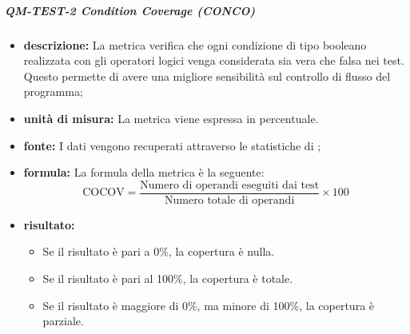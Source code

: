             \subparagraph{QM-TEST-2 Condition Coverage (CONCO)}
            \begin{itemize}
                \item \textbf{descrizione: }
                    La metrica verifica che ogni condizione di tipo booleano realizzata con gli operatori logici venga considerata sia vera che falsa nei test. Questo permette di avere una migliore sensibilità sul controllo di flusso del programma;

                \item \textbf{unità di misura: }
                La metrica viene espressa in percentuale.

                \item \textbf{fonte: }
                    I dati vengono recuperati attraverso le statistiche di ;

                \item \textbf{formula: }
                La formula della metrica è la seguente:
                \[
                    \text{COCOV} = \frac{\text{Numero di operandi eseguiti dai test}}{\text{Numero totale di operandi}} \times 100
                \]

                \item \textbf{risultato: }
                \begin{itemize}
                    \item Se il risultato è pari a 0\%, la copertura è nulla.
                    \item Se il risultato è pari al 100\%, la copertura è totale.
                    \item Se il risultato è maggiore di 0\%, ma minore di 100\%, la copertura è parziale.
                \end{itemize}
            \end{itemize}


